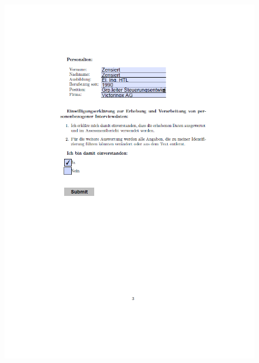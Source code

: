 \begin{figure}[ht]
 	\centering
 	\includegraphics[width=1.3\textwidth]{images/Horat3.png}
 	\label{fig:hor3}
\end{figure}

 


